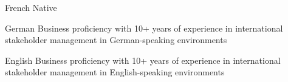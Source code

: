 

\begin{cvskills}
  \cvskill
    {French} %
    {Native} %

  \cvskill
    {German} %
    {Business proficiency with 10+ years of experience in international stakeholder management in German-speaking environments} %

  \cvskill
    {English} %
    {Business proficiency with 10+ years of experience in international stakeholder management in English-speaking environments} %

\end{cvskills}
